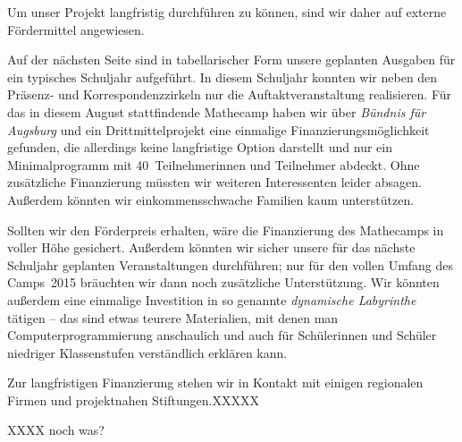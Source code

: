 \documentclass[12pt]{zettel}
\begin{document}
Um unser Projekt langfristig durchführen zu können, sind wir daher auf externe
Fördermittel angewiesen.

Auf der nächsten Seite sind in tabellarischer Form unsere geplanten Ausgaben für ein
typisches Schuljahr aufgeführt. In diesem Schuljahr konnten wir
neben den Präsenz- und Korrespondenzzirkeln nur die Auftaktveranstaltung
realisieren. Für das in diesem August
stattfindende Mathecamp haben wir über \emph{Bündnis für Augsburg} und ein
Drittmittelprojekt eine einmalige Finanzierungsmöglichkeit gefunden, die
allerdings keine langfristige Option darstellt und nur ein Minimalprogramm mit 40~Teilnehmerinnen und
Teilnehmer abdeckt. Ohne zusätzliche Finanzierung müssten wir weiteren
Interessenten leider absagen. Außerdem könnten wir einkommensschwache Familien
kaum unterstützen.

Sollten wir den Förderpreis erhalten, wäre die Finanzierung des Mathecamps in
voller Höhe gesichert. Außerdem könnten wir sicher unsere für das nächste Schuljahr
geplanten Veranstaltungen durchführen; nur für den vollen Umfang des
Camps~2015 bräuchten wir dann noch zusätzliche Unterstützung. Wir könnten außerdem
eine einmalige Investition in so genannte \emph{dynamische Labyrinthe} tätigen --
das sind etwas teurere Materialien, mit denen man
Computerprogrammierung anschaulich und auch für Schülerinnen und Schüler niedriger Klassenstufen
verständlich erklären kann.

Zur langfristigen Finanzierung stehen wir in Kontakt mit einigen regionalen Firmen und projektnahen Stiftungen.XXXXX

XXXX noch was?
\end{document}
